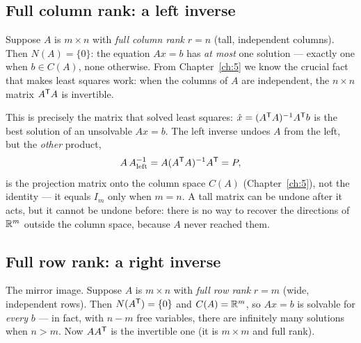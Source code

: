 \subsection{Full column rank: a left inverse}

Suppose $A$ is $m\times n$ with \emph{full column rank} $r=n$ (tall, independent columns). Then $N(A)=\{0\}$: the equation $Ax=b$ has \emph{at most} one solution --- exactly one when $b\in C(A)$, none otherwise. From Chapter~\ref{ch:5} we know the crucial fact that makes least squares work: when the columns of $A$ are independent, the $n\times n$ matrix $A^{\mathsf T} A$ is invertible.


This is precisely the matrix that solved least squares: $\hat x=(A^{\mathsf T} A)^{-1}A^{\mathsf T} b$ is the best solution of an unsolvable $Ax=b$. The left inverse undoes $A$ from the left, but the \emph{other} product,
\[
   A\,A^{-1}_{\text{left}} = A(A^{\mathsf T} A)^{-1}A^{\mathsf T} = P,
\]
is the projection matrix onto the column space $C(A)$ (Chapter~\ref{ch:5}), not the identity --- it equals $I_m$ only when $m=n$. A tall matrix can be undone after it acts, but it cannot be undone before: there is no way to recover the directions of $\mathbb{R}^m$ outside the column space, because $A$ never reached them.

\subsection{Full row rank: a right inverse}

The mirror image. Suppose $A$ is $m\times n$ with \emph{full row rank} $r=m$ (wide, independent rows). Then $N(A^{\mathsf T})=\{0\}$ and $C(A)=\mathbb{R}^m$, so $Ax=b$ is solvable for \emph{every} $b$ --- in fact, with $n-m$ free variables, there are infinitely many solutions when $n>m$. Now $AA^{\mathsf T}$ is the invertible one (it is $m\times m$ and full rank).


